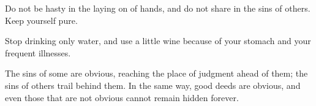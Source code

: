 \documentclass{beamer}
\begin{document}
\begin{frame}
    Do not be hasty in the laying on of hands, and do not share in the sins of
    others. Keep yourself pure.

    Stop drinking only water, and use a little wine because of your stomach and
    your frequent illnesses.

    The sins of some are obvious, reaching the place of judgment ahead of them; the
    sins of others trail behind them. 
    In the same way, good deeds are obvious, and even those that are not obvious
    cannot remain hidden forever.
\end{frame}
\end{document}
